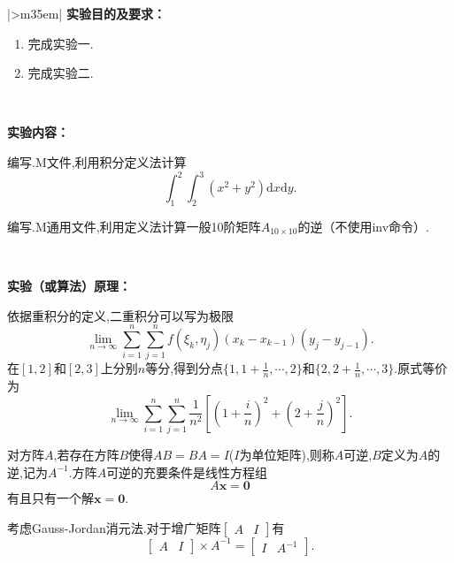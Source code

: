 \documentclass{my_GZUexrept}
\begin{document}
\maketitle
\begin{longtable}[c]{|>{\setlength\parindent{2em}}m{35em}|} \hline
\noindent\textbf{实验目的及要求：}\par
    \begin{enumerate}
            \item 完成实验一.
            \item 完成实验二.
    \end{enumerate}
\\ \hline

\noindent\textbf{实验内容：}\par
    \begin{experiment}[1]
        编写.M文件,利用积分定义法计算
    \[
        \int_1^2\int_2^3 (x^2+y^2) \mathrm{d}x\mathrm{d}y.
    \]
    \end{experiment}

    \begin{experiment}[2]
        编写.M通用文件,利用定义法计算一般10阶矩阵$A_{10\times10}$的逆（不使用inv命令）.
    \end{experiment}
\\ \hline

\noindent\textbf{实验（或算法）原理：}\par
    依据重积分的定义,二重积分可以写为极限
\[
    \lim_{n\rightarrow\infty} \sum_{i=1}^{n} \sum_{j=1}^{n} f(\xi_k,\eta_j)(x_k - x_{k-1})(y_j - y_{j-1}).
\]
在$[1,2]$和$[2,3]$上分别$n$等分,得到分点$\{1,1+\frac{1}{n},\cdots,2\}$和$\{2,2+\frac{1}{n},\cdots,3\}$.原式等价为
\[
    \lim_{n\rightarrow\infty} \sum_{i=1}^{n} \sum_{j=1}^{n} \frac{1}{n^2} [(1+\frac{i}{n})^2 + (2+\frac{j}{n})^2].
\]

    对方阵$A$,若存在方阵$B$使得$AB = BA = I$($I$为单位矩阵),则称$A$可逆,$B$定义为$A$的逆,记为$A^{-1}$.方阵$A$可逆的充要条件是线性方程组
\[
    A\mathbf{x} = \mathbf{0}
\]
有且只有一个解$\mathbf{x} = \mathbf{0}$.

    考虑Gauss-Jordan消元法.对于增广矩阵$\left[ \begin{smallmatrix} A & I\end{smallmatrix}\right]$有
\[
    \begin{bmatrix}A & I\end{bmatrix} \times A^{-1} = \begin{bmatrix}I & A^{-1}\end{bmatrix}.
\]
\\ \hline


\end{longtable}
\end{document}
